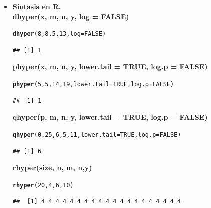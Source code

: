 \documentclass[12pt,letterpaper]{article}\usepackage[]{graphicx}\usepackage[]{color}
\makeatletter
\newcommand{\hlnum}[1]{\textcolor[rgb]{0.686,0.059,0.569}{#1}}%
\newcommand{\hlstd}[1]{\textcolor[rgb]{0.345,0.345,0.345}{#1}}%
\newcommand{\hlkwc}[1]{\textcolor[rgb]{0.333,0.667,0.333}{#1}}%
\newcommand{\hlkwd}[1]{\textcolor[rgb]{0.737,0.353,0.396}{\textbf{#1}}}%
\newenvironment{kframe}{%
 \def\at@end@of@kframe{}%
 \ifinner\ifhmode%
  \def\at@end@of@kframe{\end{minipage}}%
  \begin{minipage}{\columnwidth}%
 \fi\fi%
 \def\FrameCommand##1{\hskip\@totalleftmargin \hskip-\fboxsep
 \colorbox{shadecolor}{##1}\hskip-\fboxsep
     \hskip-\linewidth \hskip-\@totalleftmargin \hskip\columnwidth}%
 \MakeFramed {\advance\hsize-\width
   \@totalleftmargin\z@ \linewidth\hsize
   \@setminipage}}%
 {\par\unskip\endMakeFramed%
 \at@end@of@kframe}
\newenvironment{knitrout}{}{} %
\makeatother
\begin{document}
\begin{enumerate}
\begin{itemize}
\item \textbf{Sintasis en R.}\\

\textbf{dhyper(x, m, n, y, log = FALSE)}
\begin{knitrout}
\color{fgcolor}\begin{kframe}
\begin{alltt}
\hlkwd{dhyper}\hlstd{(}\hlnum{8}\hlstd{,} \hlnum{8}\hlstd{,} \hlnum{5}\hlstd{,} \hlnum{13}\hlstd{,} \hlkwc{log} \hlstd{=} \hlnum{FALSE}\hlstd{)}
\end{alltt}
\begin{verbatim}
## [1] 1
\end{verbatim}
\end{kframe}
\end{knitrout}

\textbf{phyper(x, m, n, y, lower.tail = TRUE, log.p = FALSE)}
\begin{knitrout}
\color{fgcolor}\begin{kframe}
\begin{alltt}
\hlkwd{phyper}\hlstd{(}\hlnum{5}\hlstd{,} \hlnum{5}\hlstd{,} \hlnum{14}\hlstd{,} \hlnum{19}\hlstd{,} \hlkwc{lower.tail} \hlstd{=} \hlnum{TRUE}\hlstd{,} \hlkwc{log.p} \hlstd{=} \hlnum{FALSE}\hlstd{)}
\end{alltt}
\begin{verbatim}
## [1] 1
\end{verbatim}
\end{kframe}
\end{knitrout}

\textbf{qhyper(p, m, n, y, lower.tail = TRUE, log.p = FALSE)}
\begin{knitrout}
\color{fgcolor}\begin{kframe}
\begin{alltt}
\hlkwd{qhyper}\hlstd{(}\hlnum{0.25}\hlstd{,} \hlnum{6}\hlstd{,} \hlnum{5}\hlstd{,} \hlnum{11}\hlstd{,} \hlkwc{lower.tail} \hlstd{=} \hlnum{TRUE}\hlstd{,} \hlkwc{log.p} \hlstd{=} \hlnum{FALSE}\hlstd{)}
\end{alltt}
\begin{verbatim}
## [1] 6
\end{verbatim}
\end{kframe}
\end{knitrout}

\textbf{rhyper(size, n, m, n,y)}
\begin{knitrout}
\color{fgcolor}\begin{kframe}
\begin{alltt}
\hlkwd{rhyper}\hlstd{(}\hlnum{20}\hlstd{,} \hlnum{4}\hlstd{,} \hlnum{6}\hlstd{,} \hlnum{10}\hlstd{)}
\end{alltt}
\begin{verbatim}
##  [1] 4 4 4 4 4 4 4 4 4 4 4 4 4 4 4 4 4 4 4 4
\end{verbatim}
\end{kframe}
\end{knitrout}
\end{itemize}


\end{enumerate}
\end{document}
